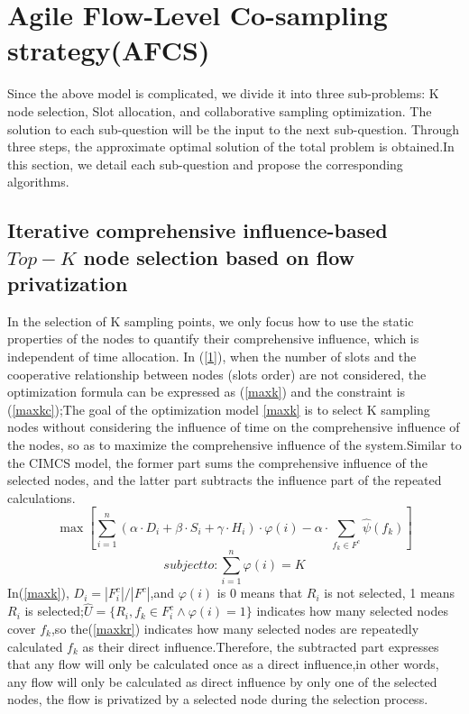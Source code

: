 \documentclass[conference]{IEEEtran}
\begin{document}
\section{Agile Flow-Level Co-sampling strategy(AFCS)}
Since the above model is complicated, we divide it into three sub-problems: K node selection, Slot allocation, and collaborative sampling optimization. The solution to each sub-question will be the input to the next sub-question. Through three steps, the approximate optimal solution of the total problem is obtained.In this section, we detail each sub-question and propose the corresponding algorithms.
\subsection{Iterative comprehensive influence-based $Top-K$ node selection based on flow privatization} 
In the selection of K sampling points, we only focus how to use the static properties of the nodes to quantify their comprehensive influence, which is independent of time allocation. In (\ref{1}), when the number of slots and the cooperative relationship between nodes (slots order) are not considered, the optimization formula can be expressed as (\ref{maxk}) and the constraint is (\ref{maxkc});The goal of the optimization model \ref{maxk} is to select K sampling nodes without considering the influence of time on the comprehensive influence of the nodes, so as to maximize the comprehensive influence of the system.Similar to the CIMCS model, the former part sums the comprehensive influence of the selected nodes, and the latter part subtracts the influence part of the repeated calculations.
\begin{equation}
\max [\sum_{i=1}^n (\alpha \cdot {D_{i}} + \beta \cdot {S_{i}} + \gamma \cdot {H_{i}}) \cdot \varphi{(i)} - \alpha \cdot\sum_{f_k \in F^c} \widehat{\psi}{(f_k)}]
\label{maxk}
\end{equation}
\begin{equation}
subject to:\sum_{i=1}^{n} \varphi(i) = K
\label{maxkc}
\end{equation}
In(\ref{maxk}), $D_i=|F^c_i|/|F^c|$,and $\varphi(i)$ is 0 means that $R_i$ is not selected, 1 means $R_i$ is selected;$\widehat{U} = \{R_i,f_k \in F^c_i \wedge \varphi(i) = 1\}$ indicates how many selected nodes cover $f_k$,so the(\ref{maxkr}) indicates how many selected nodes are repeatedly calculated $f_k$ as their direct influence.Therefore, the subtracted part expresses that any flow will only be calculated once as a direct influence,in other words, any flow will only be calculated as direct influence by only one of the selected nodes, the flow is privatized by a selected node during the selection process.
\end{document}
